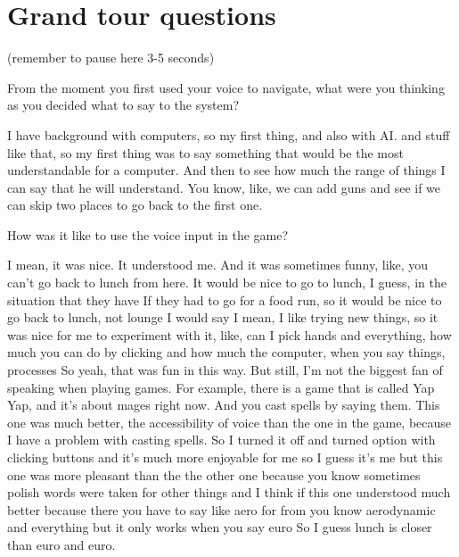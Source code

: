 \section{Grand tour questions}
(remember to pause here 3-5 seconds)

\begin{QandA}


   \item From the moment you first used your voice to navigate, what were you thinking as you decided what to say to the system?

         \begin{answered}
            I have background with computers, so my first thing, and also with AI.
            and stuff like that, so my first thing was to say something that would be the most understandable for a computer.
            And then to see how much the range of things I can say that he will understand.
            You know, like, we can add guns and see if we can skip two places to go back to the first one.
         \end{answered}

    \item How was it like to use the voice input in the game?
         \begin{answered}
            I mean, it was nice.
            It understood me.
            And it was sometimes funny, like, you can't go back to lunch from here.
            It would be nice to go to lunch, I guess, in the situation that they have If they had to go for a food run, so it would be nice to go back to lunch, not lounge I would say I mean, I like trying new things, so it was nice for me to experiment with it, like, can I pick hands and everything, how much you can do by clicking and how much the computer, when you say things, processes
            So yeah, that was fun in this way.
            But still, I'm not the biggest fan of speaking when playing games.
            For example, there is a game that is called Yap Yap, and it's about mages right now.
            And you cast spells by saying them.
            This one was much better, the accessibility of voice than the one in the game, because I have a problem with casting spells.
            So I turned it off and turned
            option with clicking buttons and it's much more enjoyable for me so I guess it's me but this one was more pleasant than the the other one because you know sometimes polish words were taken for other things and I think if this one understood much better because there you have to say like aero for from you know aerodynamic and everything but it only works when you say euro
            So I guess lunch is closer than euro and euro.
         \end{answered}


\end{QandA}




